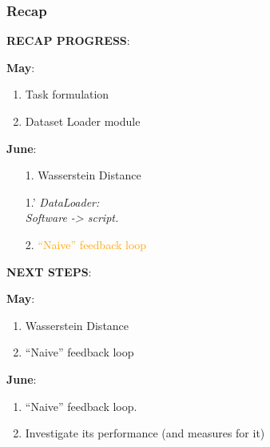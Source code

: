 \begin{frame}
\frametitle{Recap} \vspace{-1cm}
	\begin{minipage}{0.45\textwidth}
		\textbf{RECAP PROGRESS}:\newline
		
		\textbf{May}:
		\begin{enumerate}
			\item Task formulation
			\item Dataset Loader module
			\newline
		\end{enumerate}
		
		\textbf{June}:
		\begin{enumerate}
			\item[1.] Wasserstein Distance
			\item[1.'] \textit{DataLoader:\\Software -> script.}
			\item[2.] \textcolor{orange}{\enquote{Naive} feedback loop} \newline
		\end{enumerate}
	\end{minipage}
	\begin{minipage}{0.45\textwidth}
		\textbf{NEXT STEPS}:\newline
		
		\textbf{May}:
		\begin{enumerate}
			\item Wasserstein Distance
			\item \enquote{Naive} feedback loop
			\newline
		\end{enumerate}
		
		\textbf{June}:
		\begin{enumerate}
			\item \enquote{Naive} feedback loop.
			\item Investigate its performance (and measures for it)
			\newline
			\item[]
		\end{enumerate}		
	\end{minipage}
\end{frame}


